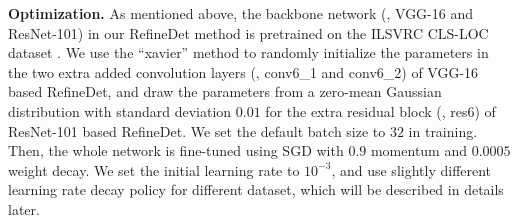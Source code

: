 \documentclass[10pt,twocolumn,letterpaper]{article}
\begin{document}
{\noindent \textbf{Optimization.}}
As mentioned above, the backbone network (\eg, VGG-16 and ResNet-101) in our RefineDet method is pretrained on the ILSVRC CLS-LOC dataset \cite{DBLP:journals/ijcv/RussakovskyDSKS15}. We use the ``xavier'' method \cite{DBLP:journals/jmlr/GlorotB10} to randomly initialize the parameters in the two extra added convolution layers (\ie, conv6\_1 and conv6\_2) of VGG-16 based RefineDet, and draw the parameters from a zero-mean Gaussian distribution with standard deviation $0.01$ for the extra residual block (\ie, res6) of ResNet-101 based RefineDet. We set the default batch size to $32$ in training. Then, the whole network is fine-tuned using SGD with $0.9$ momentum and $0.0005$ weight decay. We set the initial learning rate to $10^{-3}$, and use slightly different learning rate decay policy for different dataset, which will be described in details later.
\end{document}
